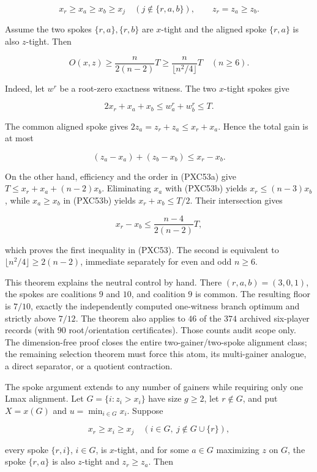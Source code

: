 \documentclass[11pt]{article}
\begin{document}
\[
 x_r\ge x_a\ge x_b\ge x_j\quad(j\notin\{r,a,b\}),
 \qquad z_r=z_a\ge z_b.                              \tag{PXC53a}
\]

Assume the two spokes $\{r,a\},\{r,b\}$ are $x$-tight and the aligned
spoke $\{r,a\}$ is also $z$-tight.  Then

\[
 \boxed{\qquad O(x,z)\ge \frac{n}{2(n-2)}T
       \ge \frac{n}{\lfloor n^2/4\rfloor}T
       \quad(n\ge6).\qquad}                          \tag{PXC53}
\]

Indeed, let $w^r$ be a root-zero exactness witness.  The two $x$-tight
spokes give

\[
 2x_r+x_a+x_b\le w^r_a+w^r_b\le T.                 \tag{PXC53b}
\]

The common aligned spoke gives $2z_a=z_r+z_a\le x_r+x_a$.  Hence the total
gain is at most

\[
 (z_a-x_a)+(z_b-x_b)\le x_r-x_b.                    \tag{PXC53c}
\]

On the other hand, efficiency and the order in (PXC53a) give
$T\le x_r+x_a+(n-2)x_b$.  Eliminating $x_a$ with (PXC53b) yields
$x_r\le(n-3)x_b$, while $x_a\ge x_b$ in (PXC53b) yields
$x_r+x_b\le T/2$.  Their intersection gives

\[
 x_r-x_b\le \frac{n-4}{2(n-2)}T,
\]

which proves the first inequality in (PXC53).  The second is equivalent to
$\lfloor n^2/4\rfloor\ge2(n-2)$, immediate separately for even and odd
$n\ge6$.

This theorem explains the neutral control by hand.  There
$(r,a,b)=(3,0,1)$, the spokes are coalitions $9$ and $10$, and coalition
$9$ is common.  The resulting floor is $7/10$, exactly the independently
computed one-witness branch optimum and strictly above $7/12$.  The theorem
also applies to $46$ of the $374$ archived six-player records (with $90$
root/orientation certificates).  Those counts audit scope only.  The
dimension-free proof closes the entire two-gainer/two-spoke alignment class;
the remaining selection theorem must force this atom, its multi-gainer
analogue, a direct separator, or a quotient contraction.

The spoke argument extends to any number of gainers while requiring only one
Lmax alignment.  Let $G=\{i:z_i>x_i\}$ have size $g\ge2$, let
$r\notin G$, and put $X=x(G)$ and $u=\min_{i\in G}x_i$.  Suppose

\[
 x_r\ge x_i\ge x_j\quad(i\in G,\ j\notin G\cup\{r\}),               \tag{PXC54a}
\]

every spoke $\{r,i\}$, $i\in G$, is $x$-tight, and for some
$a\in G$ maximizing $z$ on $G$, the spoke $\{r,a\}$ is also $z$-tight
and $z_r\ge z_a$.  Then
\end{document}
